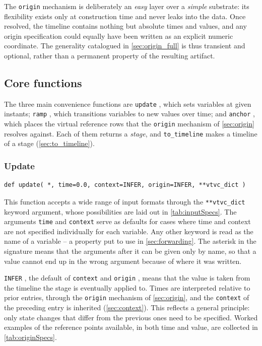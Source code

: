 \documentclass{SciPost}
\newcommand{\python}[1]{%
  \texttt{#1}%
}
\begin{document}
The \python{origin} mechanism is deliberately an \emph{easy} layer over a \emph{simple} substrate: its flexibility exists only at construction time and never leaks into the data. Once resolved, the timeline contains nothing but absolute times and values, and any origin specification could equally have been written as an explicit numeric coordinate. The generality catalogued in \cref{sec:origin_full} is thus transient and optional, rather than a permanent property of the resulting artifact.
 
\subsection{Core functions}
\label{sec:functions}

The three main convenience functions are \python{update}, which sets variables at given instants; \python{ramp}, which transitions variables to new values over time; and \python{anchor}, which places the virtual reference rows that the \python{origin} mechanism of \cref{sec:origin} resolves against. Each of them returns a \emph{stage}, and \python{to_timeline} makes a timeline of a stage (\cref{sec:to_timeline}).

\subsubsection{Update}
%
\begin{verbatim}
def update( *, time=0.0, context=INFER, origin=INFER, **vtvc_dict )
\end{verbatim}
%
This function accepts a wide range of input formats through the \python{**vtvc_dict} keyword argument, whose possibilities are laid out in \cref{tab:inputSpecs}. The arguments \python{time} and \python{context} serve as defaults for cases where time and context are not specified individually for each variable. Any other keyword is read as the name of a variable – a property put to use in \cref{sec:forwarding}. The asterisk in the signature means that the arguments after it can be given only by name, so that a value cannot end up in the wrong argument because of where it was written.

\python{INFER}, the default of \python{context} and \python{origin}, means that the value is taken from the timeline the stage is eventually applied to. Times are interpreted relative to prior entries, through the \python{origin} mechanism of \cref{sec:origin}, and the \python{context} of the preceding entry is inherited (\cref{sec:context}). This reflects a general principle: only state changes that differ from the previous ones need to be specified. Worked examples of the reference points available, in both time and value, are collected in \cref{tab:originSpecs}.
\end{document}
